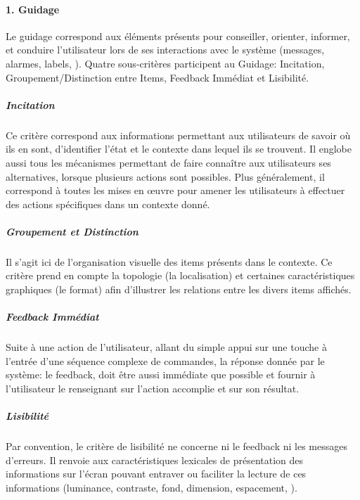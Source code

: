         \paragraph{1. Guidage}
            Le guidage correspond aux éléments présents pour conseiller, orienter, informer, et conduire l’utilisateur lors de ses interactions avec le système (messages, alarmes, labels, \etc). Quatre sous-critères participent au Guidage: Incitation, Groupement/Distinction entre Items, Feedback Immédiat et Lisibilité.
            \subparagraph{Incitation}
                Ce critère correspond aux informations permettant aux utilisateurs de savoir où ils en sont, d’identifier l’état et le contexte dans lequel ils se trouvent. Il englobe aussi tous les mécanismes permettant de faire connaître aux utilisateurs ses alternatives, lorsque plusieurs actions sont possibles. Plus généralement, il correspond à toutes les mises en œuvre pour amener les utilisateurs à effectuer des actions spécifiques dans un contexte donné.
            \subparagraph{Groupement et Distinction}
                Il s'agit ici de l’organisation visuelle des items présents dans le contexte. Ce critère prend en compte la topologie (la localisation) et certaines caractéristiques graphiques (le format) afin d’illustrer les relations entre les divers items affichés.%
            \subparagraph{Feedback Immédiat}
                Suite à une action de l'utilisateur, allant du simple appui sur une touche à l’entrée d’une séquence complexe de commandes, la réponse donnée par le système: le feedback, doit être aussi immédiate que possible et fournir à l’utilisateur le renseignant sur l’action accomplie et sur son résultat.
            \subparagraph{Lisibilité}
                Par convention, le critère de lisibilité ne concerne ni le feedback ni les messages d’erreurs. Il renvoie aux caractéristiques lexicales de présentation des informations sur l’écran pouvant entraver ou faciliter la lecture de ces informations (luminance, contraste, fond, dimension, espacement, \etc). 
